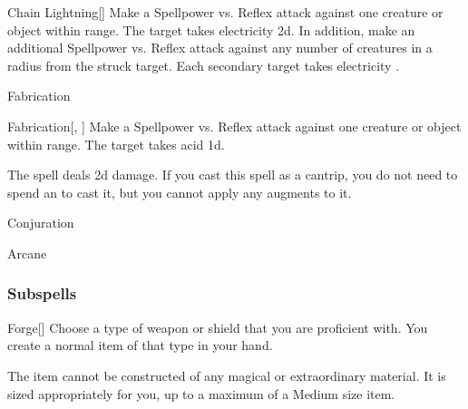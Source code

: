 \begin{ability}[\nth{6}]{Chain Lightning}[]
Make a Spellpower vs. Reflex attack against one creature or object within \rngmed range.
\hit The target takes electricity  \plus2d.
In addition, make an additional Spellpower vs. Reflex attack against any number of creatures in a \areamed radius from the struck target.
\hit Each secondary target takes electricity .
\end{ability}
\vspace{0.25em}

\newpage
\begin{spellsection}{Fabrication}

\begin{spellheader}
\end{spellheader}


\begin{ability}{Fabrication}[, ]
Make a Spellpower vs. Reflex attack against one creature or object within \rngmed range.
\hit The target takes acid  \plus1d.
\end{ability}



 The spell deals \minus2d damage. If you cast this spell as a cantrip,
you do not need to spend an  to cast it,
but you cannot apply any augments to it.


 Conjuration

 Arcane
\end{spellsection}


\subsubsection{Subspells}


\begin{ability}[\nth{1}]{Forge}[]
Choose a type of weapon or shield that you are proficient with.
You create a normal item of that type in your hand.

The item cannot be constructed of any magical or extraordinary material.
It is sized appropriately for you, up to a maximum of a Medium size item.
\end{ability}
\vspace{0.25em}


